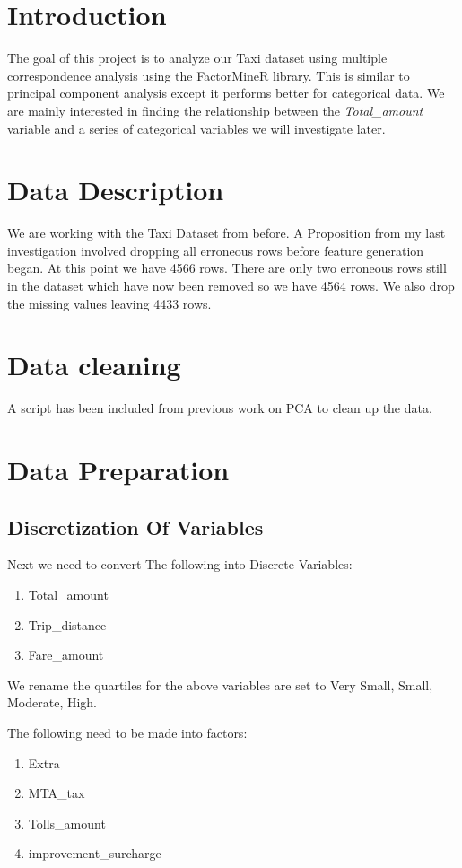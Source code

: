 \documentclass{article}
\begin{document}
\section{Introduction}
The goal of this project is to analyze our Taxi dataset using multiple correspondence analysis using the FactorMineR library. This is similar to principal component analysis except it performs better for categorical data. We are mainly interested in finding the relationship between the \textit{Total\_amount} variable and a series of categorical variables we will investigate later.

\section{Data Description}
We are working with the Taxi Dataset from before. A Proposition from my last investigation involved dropping all erroneous rows before feature generation began. At this point we have 4566 rows. There are only two erroneous rows still in the dataset which have now been removed so we have 4564 rows. We also drop the missing values leaving 4433 rows.

\section{Data cleaning}
A script has been included from previous work on PCA to clean up the data.

\section{Data Preparation}
\subsection{Discretization Of Variables}
Next we need to convert The following into Discrete Variables:
\begin{enumerate}
\item Total\_amount
\item Trip\_distance
\item Fare\_amount
\end{enumerate}
We rename the quartiles for the above variables are set to Very Small, Small, Moderate, High.

The following need to be made into factors:
\begin{enumerate}
\item Extra
\item MTA\_tax
\item Tolls\_amount
\item improvement\_surcharge
\end{enumerate}
\end{document}

